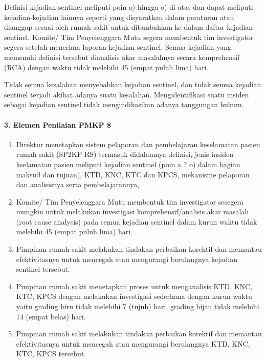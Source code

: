 \documentclass[
]{book}
\providecommand{\tightlist}{%
  \setlength{\itemsep}{0pt}\setlength{\parskip}{0pt}}
\begin{document}
Definisi kejadian sentinel meliputi poin a) hingga o) di atas dan dapat meliputi kejadian-kejadian lainnya seperti yang disyaratkan dalam peraturan atau dianggap sesuai oleh rumah sakit untuk ditambahkan ke dalam daftar kejadian sentinel. Komite/ Tim Penyelenggara Mutu segera membentuk tim investigator segera setelah menerima laporan kejadian sentinel. Semua kejadian yang memenuhi definisi tersebut dianalisis akar masalahnya secara komprehensif (RCA) dengan waktu tidak melebihi 45 (empat puluh lima) hari.

Tidak semua kesalahan menyebabkan kejadian sentinel, dan tidak semua kejadian sentinel terjadi akibat adanya suatu kesalahan. Mengidentifikasi suatu insiden sebagai kejadian sentinel tidak mengindikasikan adanya tanggungan hukum.

\hypertarget{elemen-penilaian-pmkp-8}{%
\paragraph*{3. Elemen Penilaian PMKP 8}\label{elemen-penilaian-pmkp-8}}

\begin{enumerate}
\def\labelenumi{\alph{enumi}.}
\tightlist
\item
  Direktur menetapkan sistem pelaporan dan pembelajaran keselamatan pasien rumah sakit (SP2KP RS) termasuk didalamnya definisi, jenis insiden kselamatan pasien meliputi kejadian sentinel (poin a ? o) dalam bagian maksud dan tujuan), KTD, KNC, KTC dan KPCS, mekanisme pelaporan dan analisisnya serta pembelajarannya,
\item
  Komite/ Tim Penyelenggara Mutu membentuk tim investigator sesegera mungkin untuk melakukan investigasi komprehensif/analisis akar masalah (root cause analysis) pada semua kejadian sentinel dalam kurun waktu tidak melebihi 45 (empat puluh lima) hari.
\item
  Pimpinan rumah sakit melakukan tindakan perbaikan korektif dan memantau efektivitasnya untuk mencegah atau mengurangi berulangnya kejadian sentinel tersebut.
\item
  Pimpinan rumah sakit menetapkan proses untuk menganalisis KTD, KNC, KTC, KPCS dengan melakukan investigasi sederhana dengan kurun waktu yaitu grading biru tidak melebihi 7 (tujuh) hari, grading hijau tidak melebihi 14 (empat belas) hari.
\item
  Pimpinan rumah sakit melakukan tindakan perbaikan korektif dan memantau efektivitasnya untuk mencegah atau mengurangi berulangnya KTD, KNC, KTC, KPCS tersebut.
\end{enumerate}
\end{document}
